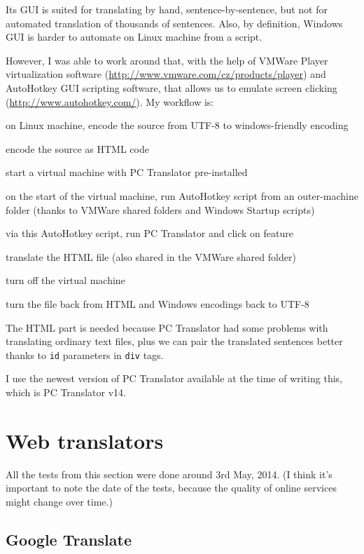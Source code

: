 Its GUI is suited for translating by hand, sentence-by-sentence, but not for automated translation of thousands of sentences. Also, by definition, Windows GUI is harder to automate on Linux machine from a script.

However, I was able to work around that, with the help of VMWare Player virtualization software (\url{http://www.vmware.com/cz/products/player}) and Au\-to\-Hot\-key GUI scripting software, that allows us to emulate screen clicking (\url{http://www.autohotkey.com/}). My workflow is:

\begin{pitemize}
\item on Linux machine, encode the source from UTF-8 to windows-friendly encoding
\item encode the source as HTML code
\item start a virtual machine with PC Translator pre-installed
\item on the start of the virtual machine, run AutoHotkey script from an outer-machine folder (thanks to VMWare shared folders and Windows Startup scripts)
\item via this AutoHotkey script, run PC Translator and click on  feature 
\item translate the HTML file (also shared in the VMWare shared folder)
\item turn off the virtual machine
\item turn the file back from HTML and Windows encodings back to UTF-8
\end{pitemize}

The HTML part is needed because PC Translator had some problems with translating ordinary text files, plus we can pair the translated sentences better thanks to \texttt{id} parameters in \texttt{div} tags.

I use the newest version of PC Translator available at the time of writing this, which is PC Translator v14.

\section{Web translators}
All the tests from this section were done around 3rd May, 2014. (I think it's important to note the date of the tests, because the quality of online services might change over time.)

\subsection{Google Translate}
\label{gtranslate_ex}

